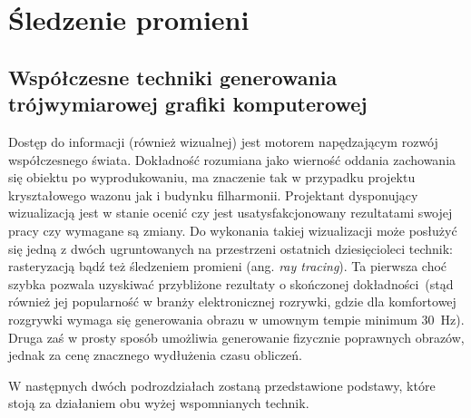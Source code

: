 \chapter{Śledzenie promieni}

\section{Współczesne techniki generowania trójwymiarowej grafiki komputerowej}
Dostęp do informacji (również wizualnej) jest motorem napędzającym rozwój współczesnego świata. Dokładność rozumiana jako wierność oddania zachowania się obiektu po wyprodukowaniu, ma znaczenie tak w przypadku projektu kryształowego wazonu jak i budynku filharmonii. Projektant dysponujący wizualizacją jest w stanie ocenić czy jest usatysfakcjonowany rezultatami swojej pracy czy wymagane są zmiany. Do wykonania takiej wizualizacji może posłużyć się jedną z dwóch ugruntowanych na przestrzeni ostatnich dziesięcioleci technik: rasteryzacją bądź też śledzeniem promieni (ang. \textit{ray tracing}). Ta pierwsza choć szybka pozwala uzyskiwać przybliżone rezultaty o skończonej dokładności~(stąd również jej popularność w branży elektronicznej rozrywki, gdzie dla komfortowej rozgrywki wymaga się generowania obrazu w umownym tempie minimum 30~Hz). Druga zaś w prosty sposób umożliwia generowanie fizycznie poprawnych obrazów, jednak za cenę znacznego wydłużenia czasu obliczeń.

W następnych dwóch podrozdziałach zostaną przedstawione podstawy, które stoją za działaniem obu wyżej wspomnianych technik. 
